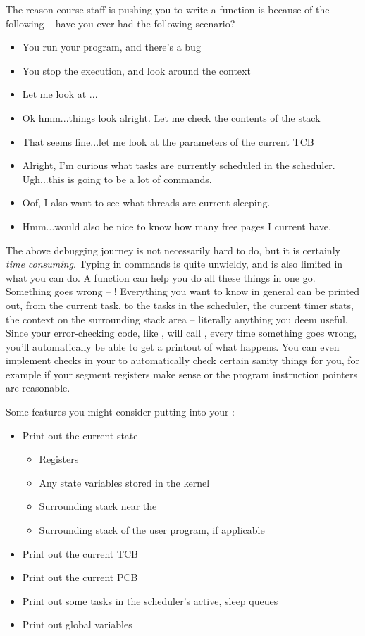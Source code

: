 \documentclass{article}
\begin{document}
The reason course staff is pushing you to write a  function is because
of the following -- have you ever had the following scenario?
\begin{itemize}
  \item You run your program, and there's a bug
  \item You stop the execution, and look around the context
  \item Let me look at ... 
  \item Ok hmm...things look alright. Let me check the contents of the stack
  \item That seems fine...let me look at the parameters of the current TCB
  \item Alright, I'm curious what tasks are currently scheduled in the scheduler. 
  Ugh...this is going to be a lot of  commands. 
  \item Oof, I also want to see what threads are current sleeping.
  \item Hmm...would also be nice to know how many free pages I current have.
\end{itemize}
The above debugging journey is not necessarily hard to do, but it is certainly \textit{time consuming}.
Typing in  commands is quite unwieldy, and is also limited in what you can do.
A  function can help you do all these things in one go. Something goes wrong -- !
Everything you want to know in general can be printed out, from the current task, to the tasks in the scheduler,
the current timer stats, the context on the surrounding stack area -- literally anything you deem useful.
Since your error-checking code, like , will call , every time something goes wrong,
you'll automatically be able to get a printout of what happens. You can even implement checks in your 
to automatically check certain sanity things for you, for example if your segment registers make sense or 
the program instruction pointers are reasonable.  

Some features you might consider putting into your :
\begin{itemize}
  \item Print out the current state
  \begin{itemize}
    \item Registers
    \item Any state variables stored in the kernel
    \item Surrounding stack near the 
    \item Surrounding stack of the user program, if applicable
  \end{itemize}
  \item Print out the current TCB 
  \item Print out the current PCB
  \item Print out some tasks in the scheduler's active, sleep queues
  \item Print out global variables
\end{itemize}
\end{document}

